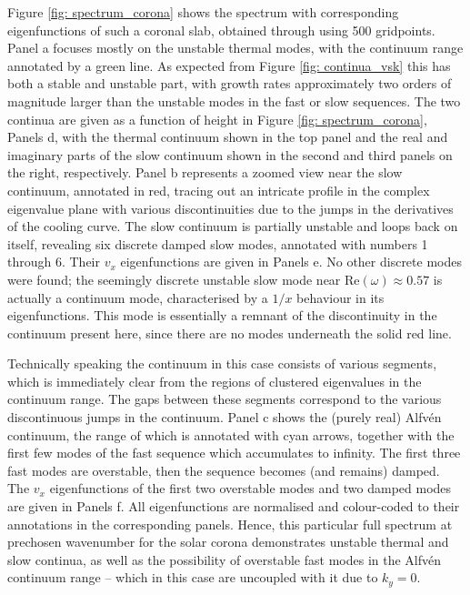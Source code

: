 Figure \ref{fig: spectrum_corona} shows the spectrum with corresponding eigenfunctions of such a coronal slab, obtained through {\legolas} using 500 gridpoints. Panel a focuses mostly on the unstable thermal modes, with the continuum range annotated by a green line. As expected from Figure \ref{fig: continua_vsk} this has both a stable and unstable part, with growth rates approximately two orders of magnitude larger than the unstable modes in the fast or slow sequences. The two continua are given as a function of height in Figure \ref{fig: spectrum_corona}, Panels d, with the thermal continuum shown in the top panel and the real and imaginary parts of the slow continuum shown in the second and third panels on the right, respectively. Panel b represents a zoomed view near the slow continuum, annotated in red, tracing out an intricate profile in the complex eigenvalue plane with various discontinuities due to the jumps in the derivatives of the cooling curve. The slow continuum is partially unstable and loops back on itself, revealing six discrete damped slow modes, annotated with numbers 1 through 6. Their $v_x$ eigenfunctions are given in Panels e. No other discrete modes were found; the seemingly discrete unstable slow mode near Re$(\omega) \approx 0.57$ is actually a continuum mode, characterised by a $1/x$ behaviour in its eigenfunctions. This mode is essentially a remnant of the discontinuity in the continuum present here, since there are no modes underneath the solid red line.

Technically speaking the continuum in this case consists of various segments, which is immediately clear from the regions of clustered eigenvalues in the continuum range. The gaps between these segments correspond to the various discontinuous jumps in the continuum. Panel c shows the (purely real) Alfv\'en continuum, the range of which is annotated with cyan arrows, together with the first few modes of the fast sequence which accumulates to infinity. The first three fast modes are overstable, then the sequence becomes (and remains) damped. The $v_x$ eigenfunctions of the first two overstable modes and two damped modes are given in Panels f. All eigenfunctions are normalised and colour-coded to their annotations in the corresponding panels. Hence, this particular full spectrum at prechosen wavenumber for the solar corona demonstrates unstable thermal and slow continua, as well as the possibility of overstable fast modes in the Alfv\'en continuum range -- which in this case are uncoupled with it due to $k_y = 0$.

